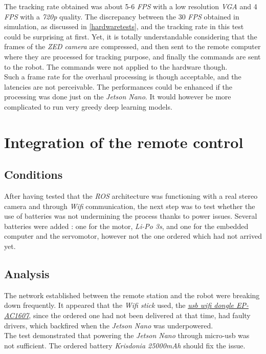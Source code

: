 		The tracking rate obtained was about 5-6 \textit{FPS} with 
		a low resolution \textit{VGA} and 4 \textit{FPS} with a \textit{720p} quality.
		The discrepancy between the 30 \textit{FPS} obtained
		in simulation, as discussed in \vref{hardwaretests}, and the 
		tracking rate in this test could be surprising at first.
		Yet, it is totally understandable considering that the 
		frames of the \textit{ZED camera} are compressed, and then sent
		to the remote computer where they are processed for tracking 
		purpose, and finally the commands are sent to the robot. 
		The commands were not applied to the hardware though.
		\\\indent Such a frame rate for the overhaul processing 
		is though acceptable, and the latencies are not 
		perceivable. The performances could be enhanced if the 
		processing was done just on the \textit{Jetson Nano}.
		It would however be more complicated to run very 
		greedy deep learning models.

	\section{Integration of the remote control}\label{test2}
	
		\subsection{Conditions}
		
		After having tested that the \textit{ROS} architecture
		was functioning with a real stereo camera and through 
		\textit{Wifi} communication,  the next step was to test
		whether the use of batteries was not undermining the 
		process thanks to power issues. Several batteries 
		were added : one for the motor, \textit{Li-Po 3s}, and 
		one for the embedded computer and the servomotor, however 
		not the one ordered which had not arrived yet. 
	
		\subsection{Analysis}
		
		The network established between 
		the remote station and the robot were breaking down frequently.
		It appeared that the \textit{Wifi stick} used, the
		\href{https://www.miniinthebox.com/en/p/5ghz-usb-wifi-adapter-600mbps-wifi-antenna-2dbi-support-windows-mac-802-11ac-usb-network-card-wifi-dongle-for-desktop-laptop-pc\_p5957285.html?prm=2.3.5.1}{\textit{usb wifi dongle EP-AC1607}}, since the 
		ordered one had not been delivered at that time, had 
		faulty drivers, which backfired when the \textit{Jetson Nano} was
		underpowered.
		\\\indent The test demonstrated that powering the 
		\textit{Jetson Nano} through micro-usb was not 
		sufficient. The ordered battery \textit{Krisdonia 25000mAh}
		should fix the issue.
		

